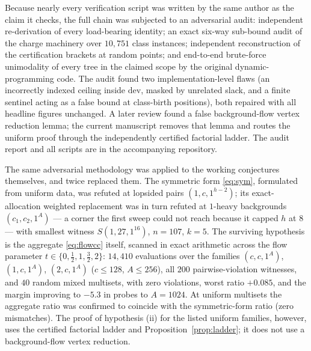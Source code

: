 \documentclass[11pt]{article}
\theoremstyle{definition}
\begin{document}
Because nearly every verification script was written by the same
author as the claim it checks, the full chain was subjected to an
adversarial audit: independent re-derivation of every load-bearing
identity; an exact six-way sub-bound audit of the charge machinery
over $10{,}751$ class instances; independent reconstruction of the
certification brackets at random points; and end-to-end brute-force
unimodality of every tree in the claimed scope by the original
dynamic-programming code.  The audit found two implementation-level
flaws (an incorrectly indexed ceiling inside $\mathrm{dev}$, masked by
unrelated slack, and a finite sentinel acting as a false bound at
class-birth positions), both repaired with all headline figures
unchanged.  A later review found a false background-flow vertex
reduction lemma; the current manuscript removes that lemma and routes
the uniform proof through the independently certified factorial
ladder.  The audit report and all scripts are in the accompanying
repository.

The same adversarial methodology was applied to the working
conjectures themselves, and twice replaced them.  The symmetric form
\eqref{eq:sym}, formulated from uniform data, was refuted at lopsided
pairs $(1,c,1^{h-2})$; its exact-allocation weighted replacement was
in turn refuted at $1$-heavy backgrounds $(c_1,c_2,1^A)$ --- a corner
the first sweep could not reach because it capped $h$ at $8$ ---
with smallest witness $S(1,27,1^{16})$, $n=107$, $k=5$.  The
surviving hypothesis is the aggregate \eqref{eq:flowcc} itself,
scanned in exact arithmetic across the flow parameter
$t\in\{0,\tfrac12,1,\tfrac32,2\}$: $14{,}410$ evaluations over the
families $(c,c,1^A)$, $(1,c,1^A)$, $(2,c,1^A)$ ($c\le128$,
$A\le256$), all $200$ pairwise-violation witnesses, and $40$ random
mixed multisets, with zero violations, worst ratio $+0.085$, and the
margin improving to $-5.3$ in probes to $A=1024$.  At uniform
multisets the aggregate ratio was confirmed to coincide with the
symmetric-form ratio (zero mismatches).  The proof of hypothesis (ii)
for the listed uniform families, however, uses the certified factorial
ladder and Proposition~\ref{prop:ladder}; it does not use a
background-flow vertex reduction.
\end{document}
